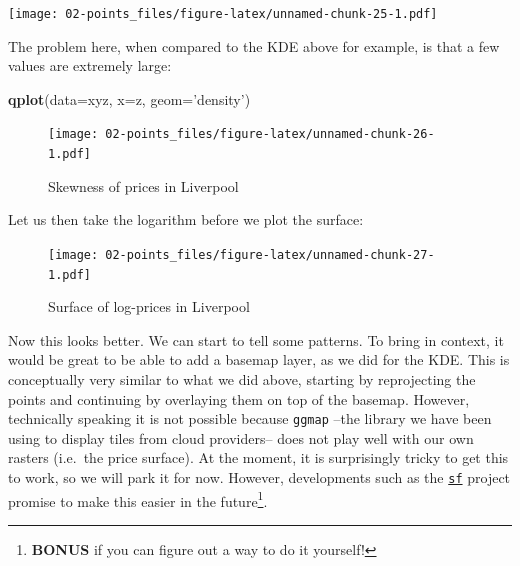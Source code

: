 \documentclass[]{book}
\newenvironment{Shaded}{\begin{snugshade}}{\end{snugshade}}
\newcommand{\DataTypeTok}[1]{\textcolor[rgb]{0.13,0.29,0.53}{#1}}
\newcommand{\KeywordTok}[1]{\textcolor[rgb]{0.13,0.29,0.53}{\textbf{#1}}}
\newcommand{\NormalTok}[1]{#1}
\newcommand{\OperatorTok}[1]{\textcolor[rgb]{0.81,0.36,0.00}{\textbf{#1}}}
\newcommand{\StringTok}[1]{\textcolor[rgb]{0.31,0.60,0.02}{#1}}
\let\rmarkdownfootnote\footnote%
\def\footnote{\protect\rmarkdownfootnote}
\begin{document}
\texttt{[image: 02-points\_files/figure-latex/unnamed-chunk-25-1.pdf]}

The problem here, when compared to the KDE above for example, is that a few values are extremely large:

\begin{Shaded}
\begin{Highlighting}[]
\KeywordTok{qplot}\NormalTok{(}\DataTypeTok{data=}\NormalTok{xyz, }\DataTypeTok{x=}\NormalTok{z, }\DataTypeTok{geom=}\StringTok{'density'}\NormalTok{)}
\end{Highlighting}
\end{Shaded}

\begin{figure}
\centering
\texttt{[image: 02-points\_files/figure-latex/unnamed-chunk-26-1.pdf]}
\caption{\label{fig:unnamed-chunk-26}Skewness of prices in Liverpool}
\end{figure}

Let us then take the logarithm before we plot the surface:

\begin{Shaded}
\end{Shaded}

\begin{figure}
\centering
\texttt{[image: 02-points\_files/figure-latex/unnamed-chunk-27-1.pdf]}
\caption{\label{fig:unnamed-chunk-27}Surface of log-prices in Liverpool}
\end{figure}

Now this looks better. We can start to tell some patterns. To bring in context, it would be great to be able to add a basemap layer, as we did for the KDE. This is conceptually very similar to what we did above, starting by reprojecting the points and continuing by overlaying them on top of the basemap. However, technically speaking it is not possible because \texttt{ggmap} --the library we have been using to display tiles from cloud providers-- does not play well with our own rasters (i.e.~the price surface). At the moment, it is surprisingly tricky to get this to work, so we will park it for now. However, developments such as the \href{https://github.com/edzer/sfr}{\texttt{sf}} project promise to make this easier in the future\footnote{\textbf{BONUS} if you can figure out a way to do it yourself!}.
\end{document}

